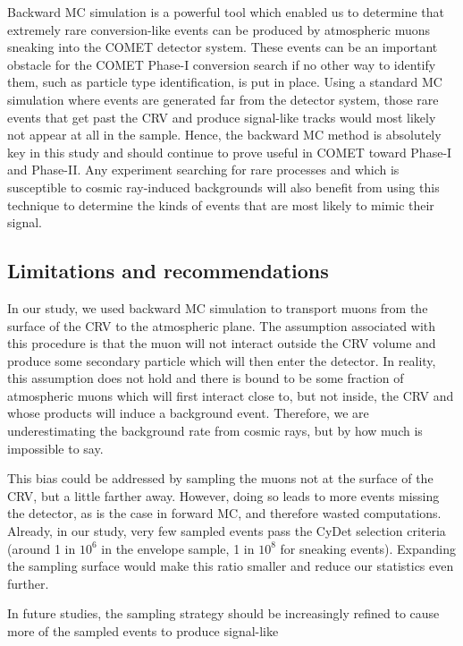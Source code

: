 
Backward MC simulation is a powerful tool which enabled us to determine that
extremely rare conversion-like events can be produced by atmospheric muons
sneaking into the COMET detector system. These events can be an important
obstacle for the COMET Phase-I conversion search if no other way to identify
them, such as particle type identification, is put in place. Using a standard MC
simulation where events are generated far from the detector system, those rare
events that get past the CRV and produce signal-like tracks would most likely
not appear at all in the sample. Hence, the backward MC method is absolutely key
in this study and should continue to prove useful in COMET toward Phase-I and
Phase-II. Any experiment searching for rare processes and which is susceptible
to cosmic ray-induced backgrounds will also benefit from using this technique to
determine the kinds of events that are most likely to mimic their signal.

\subsection{Limitations and recommendations}
In our study, we used backward MC simulation to transport muons from the surface
of the CRV to the atmospheric plane. The assumption associated with this
procedure is that the muon will not interact outside the CRV volume and produce
some secondary particle which will then enter the detector. In reality, this
assumption does not hold and there is bound to be some fraction of atmospheric
muons which will first interact close to, but not inside, the CRV and whose
products will induce a background event. Therefore, we are underestimating the
background rate from cosmic rays, but by how much is impossible to say. 

This bias could be addressed by sampling the muons not at the surface of the
CRV, but a little farther away. However, doing so leads to more events missing
the detector, as is the case in forward MC, and therefore wasted computations.
Already, in our study, very few sampled events pass the CyDet selection criteria
(around 1 in $10^6$ in the envelope sample, 1 in $10^8$ for sneaking events).
Expanding the sampling surface would make this ratio smaller and reduce our
statistics even further.

In future studies, the sampling strategy should be increasingly refined to cause
more of the sampled events to produce signal-like




